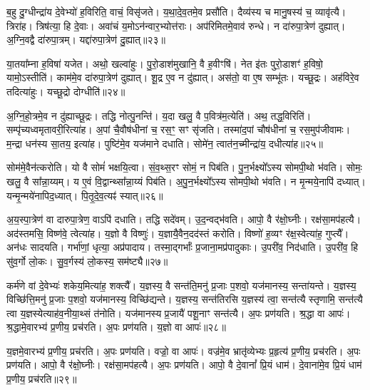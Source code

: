 ब॒हु दु॒ग्धीन्द्रा॑य दे॒वेभ्यो॑ ह॒विरिति॒ वाचं॒ विसृ॑जते।
य॒था॒दे॒व॒तमे॒व प्रसौ॑ति।
दैव्य॑स्य च मानु॒षस्य॑ च॒ व्यावृ॑त्यै।
त्रिरा॑ह।
त्रिष॑त्या॒ हि दे॒वाः।
अवा॑चं य॒मो\-ऽन॑न्वार॒भ्योत्त॑राः।
अप॑रिमितमे॒वाव॑ रुन्धे।
न दा॑रुपा॒त्रेण॑ दुह्यात्।
अ॒ग्नि॒वद्वै दा॑रुपा॒त्रम्।
यद्दा॑रुपा॒त्रेण॑ दु॒ह्यात्॥२३॥\ip\phantom{ण॑}%

या॒तया᳚म्ना ह॒विषा॑ यजेत।
अथो॒ खल्वा॑हुः।
पु॒रो॒डाश॑मुखानि॒ वै ह॒वीꣳषि॑।
नेत इ॑तः पुरो॒डाशꣳ॑ ह॒विषो॒ यामो॒\-ऽस्तीति॑।
काम॑मे॒व दा॑रुपा॒त्रेण॑ दुह्यात्।
शू॒द्र ए॒व न दु॑ह्यात्।
अस॑तो॒ वा ए॒ष सम्भू॑तः।
यच्छू॒द्रः।
अह॑विरे॒व तदित्या॑हुः।
यच्छू॒द्रो दोग्धीति॑॥२४॥\ip

अ॒ग्नि॒हो॒त्रमे॒व न दु॑ह्याच्छू॒द्रः।
तद्धि नोत्पु॒नन्ति॑।
य॒दा खलु॒ वै प॒वित्र॑म॒त्येति॑।
अथ॒ तद्ध॒विरिति॑।
सम्पृ॑च्यध्वमृतावरी॒रित्या॑ह।
अ॒पां चै॒वौष॑धीनां च॒ रस॒ꣳ॒ सꣳ सृ॑जति।
तस्मा॑द॒पां चौष॑धीनां च॒ रस॒मुप॑जीवामः।
म॒न्द्रा धन॑स्य सा॒तय॒ इत्या॑ह।
पुष्टि॑मे॒व यज॑माने दधाति।
सोमे॑न॒ त्वात॑न॒च्मीन्द्रा॑य॒ दधीत्या॑ह॥२५॥\ip

सोम॑मे॒वैन॑त्करोति।
यो वै सोमं॑ भक्षयि॒त्वा।
सं॒व॒थ्स॒रꣳ सोमं॒ न पिब॑ति।
पु॒न॒र्भक्ष्यो᳚ऽस्य सोमपी॒थो भ॑वति।
सोमः॒ खलु॒ वै सा᳚न्ना॒य्यम्।
य ए॒वं वि॒द्वान्थ्सा᳚न्ना॒य्यं पिब॑ति।
अ॒पु॒न॒र्भक्ष्यो᳚ऽस्य सोमपी॒थो भ॑वति।
न मृ॒न्मये॒नापि॑ दध्यात्।
यन्मृ॒न्मये॑नापिद॒ध्यात्।
पि॒तृ॒दे॒व॒त्यꣴ॑ स्यात्॥२६॥\ip

अ॒य॒स्पा॒त्रेण॑ वा दारुपा॒त्रेण॒ वाऽपि॑ दधाति।
तद्धि सदे॑वम्।
उ॒द॒न्वद्भ॑वति।
आपो॒ वै र॑क्षो॒घ्नीः।
रक्ष॑सा॒मप॑हत्यै।
अद॑स्तमसि॒ विष्ण॑वे॒ त्वेत्या॑ह।
य॒ज्ञो वै विष्णुः॑।
य॒ज्ञायै॒वैन॒दद॑स्तं करोति।
विष्णो॑ ह॒व्यꣳ र॑क्ष॒स्वेत्या॑ह॒ गुप्त्यै᳚।
अन॑धः सादयति।
गर्भा॑णां॒ धृत्या॒ अप्र॑पादाय।
तस्मा॒द्गर्भाः᳚ प्र॒जाना॒मप्र॑पादुकाः।
उ॒परी॑व॒ निद॑धाति।
उ॒परी॑व॒ हि सु॑व॒र्गो लो॒कः।
सु॒व॒र्गस्य॑ लो॒कस्य॒ सम॑ष्ट्यै॥२७॥\ip{}

कर्म॑णे वां दे॒वेभ्यः॑ शकेय॒मित्या॑ह॒ शक्त्यै᳚।
य॒ज्ञस्य॒ वै सन्त॑ति॒मनु॑ प्र॒जाः प॒शवो॒ यज॑मानस्य॒ सन्ता॑यन्ते।
य॒ज्ञस्य॒ विच्छि॑त्ति॒मनु॑ प्र॒जाः प॒शवो॒ यज॑मानस्य॒ विच्छि॑द्यन्ते।
य॒ज्ञस्य॒ सन्त॑तिरसि य॒ज्ञस्य॑ त्वा॒ सन्त॑त्यै स्तृणामि॒ सन्त॑त्यै त्वा य॒ज्ञस्येत्याह॑व॒नीया॒थ्सं त॑नोति।
यज॑\-मानस्य प्र॒जायै॑ पशू॒नाꣳ सन्त॑त्यै।
अ॒पः प्रण॑यति।
श्र॒द्धा वा आपः॑।
श्र॒द्धामे॒वारभ्य॑ प्र॒णीय॒ प्रच॑रति।
अ॒पः प्रण॑यति।
य॒ज्ञो वा आपः॑॥२८॥\ip

य॒ज्ञमे॒वारभ्य॑ प्र॒णीय॒ प्रच॑रति।
अ॒पः प्रण॑यति।
वज्रो॒ वा आपः॑।
वज्र॑मे॒व भ्रातृ॑व्येभ्यः प्र॒हृत्य॑ प्र॒णीय॒ प्रच॑रति।
अ॒पः प्रण॑यति।
आपो॒ वै र॑क्षो॒घ्नीः।
रक्ष॑सा॒मप॑हत्यै।
अ॒पः प्रण॑यति।
आपो॒ वै दे॒वानां᳚ प्रि॒यं धाम॑।
दे॒वाना॑मे॒व प्रि॒यं धाम॑ प्र॒णीय॒ प्रच॑रति॥२९॥\ip

